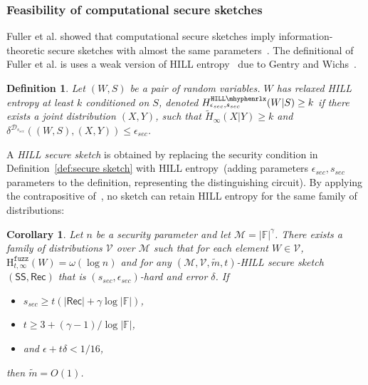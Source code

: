 \documentclass[11pt]{article}
\newcommand{\defref}[1]{\mbox{Definition~\ref{#1}}}
\newcommand{\class}[1]{{\ensuremath{\mathsf{#1}}}}
\newcommand{\sketch}{\ensuremath{\class{SS}}\xspace}
\newcommand{\rec}{\ensuremath{\class{Rec}}\xspace}
\newcommand{\hillrlx}{\ensuremath{\mathtt{HILL\mhyphen rlx}}\xspace}
\newcommand{\Hfuzz}{\mathrm{H}^{\mathtt{fuzz}}_{t,\infty}}
\newtheorem{corollary}[theorem]{Corollary}
\newtheorem{definition}[theorem]{Definition}
\begin{document}
\subsubsection{Feasibility of computational secure sketches}
Fuller et al. showed that computational secure sketches imply information-theoretic secure sketches with almost the same parameters~\cite[Corollary 3.8]{fuller2013computational}.  %
The definitional of Fuller et al. is uses a weak version of HILL entropy~\cite{DBLP:journals/siamcomp/HastadILL99} due to Gentry and Wichs~\cite{gentry2011separating}.

\begin{definition}
\label{def:relaxed hill}
Let $(W, S)$ be a pair of random variables.  $W$ has 
\emph{relaxed HILL entropy} at least $k$ conditioned on $S$,
denoted $H^{\hillrlx}_{\epsilon_{sec}, s_{sec}}(W|S)\geq k$ if there exists a joint distribution $(X, Y)$, such that $\tilde{H}_\infty(X|Y)\geq k$ and $\delta^{\mathcal{D}_{s_{sec}}} ((W, S),(X,Y))\leq \epsilon_{sec}$.
\end{definition}

A \emph{HILL secure sketch} is obtained by replacing the security condition in \defref{def:secure sketch} with HILL entropy~(adding parameters $\epsilon_{sec}, s_{sec}$ parameters to the definition, representing the distinguishing circuit).  By applying the contrapositive of~\cite[Corollary 3.8]{fuller2013computational}, no sketch can retain HILL entropy for the same family of distributions:

\begin{corollary}
\label{cor:imposs comp sketch}
Let $n$ be a security parameter and let $\mathcal{M} = |\mathbb{F}|^\gamma$.  There exists a family of distributions $\mathcal{V}$ over $\mathcal{M}$ such that for each element $W\in \mathcal{V}$, $\Hfuzz(W)= \omega(\log n)$ and for any $(\mathcal{M}, \mathcal{V}, \tilde{m}, t)$-HILL secure sketch $(\sketch, \rec)$ that is $(s_{sec}, \epsilon_{sec})$-hard and error $\delta$.  If 
\begin{itemize}
\item $s_{sec}\ge t(|\rec| + \gamma \log |\mathbb{F}|)$, 
\item $t\ge 3 + (\gamma-1)/\log |\mathbb{F}|$,
\item and $\epsilon + t\delta < 1/16$,
\end{itemize}
 then $\tilde{m} =O(1)$.
\end{corollary}
\end{document}
